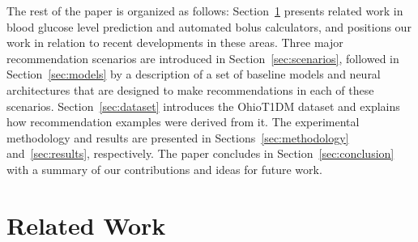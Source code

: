 \documentclass[journal,article,submit,moreauthors,pdftex]{Definitions/mdpi}
\begin{document}
The rest of the paper is organized as follows: Section~\ref{sec:related} presents related work in blood glucose level prediction and automated bolus calculators, and positions our work in relation to recent developments in these areas. Three major recommendation scenarios are introduced in Section~\ref{sec:scenarios}, followed in Section~\ref{sec:models} by a description of a set of baseline models and neural architectures that are designed to make recommendations in each of these scenarios. Section~\ref{sec:dataset} introduces the OhioT1DM dataset and explains how recommendation examples were derived from it. The experimental methodology and results are presented in Sections~\ref{sec:methodology} and~\ref{sec:results}, respectively. The paper concludes in Section~\ref{sec:conclusion} with a summary of our contributions and ideas for future work.

\section{Related Work}
\label{sec:related}
\end{document}
